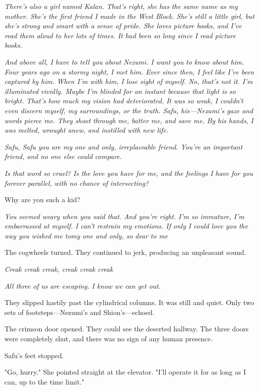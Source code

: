 \emph{There's also a girl named Kalan. That's right, she has the same name as
my mother. She's the first friend I made in the West Block. She's still
a little girl, but she's strong and smart with a sense of pride. She
loves picture books, and I've read them aloud to her lots of times. It
had been so long since I read picture books.}

\emph{And above all, I have to tell you about Nezumi. I want you to know about
him. Four years ago on a stormy night, I met him. Ever since then, I
feel like I've been captured by him. When I'm with him, I lose sight of
myself. No, that's not it. I'm illuminated vividly. Maybe I'm blinded
for an instant because that light is so bright. That's how much my
vision had deteriorated. It was so weak, I couldn't even discern myself,
my surroundings, or the truth. Safu, his---Nezumi's gaze and words pierce
me. They shoot through me, batter me, and save me. By his hands, I was
melted, wrought anew, and instilled with new life.}

\emph{Safu, Safu you are my one and only, irreplaceable friend. You're an
important friend, and no one else could compare.}

\emph{Is that word so cruel? Is the love you have for me, and the feelings I
have for you forever parallel, with no chance of intersecting?}

Why are you such a kid?

\emph{You seemed weary when you said that. And you're right. I'm so immature,
I'm embarrassed at myself. I can't restrain my emotions. If only I could
love you the way you wished me to\el my one and only, so dear to me\el }

The cogwheels turned. They continued to jerk, producing an unpleasant
sound.

\emph{Creak creak creak, creak creak creak\el }

\emph{All three of us are escaping. I know we can get out.}

They slipped hastily past the cylindrical columns. It was still and
quiet. Only two sets of footsteps---Nezumi's and Shion's---echoed.

The crimson door opened. They could see the deserted hallway. The three
doors were completely shut, and there was no sign of any human presence.

Safu's feet stopped.

"Go, hurry." She pointed straight at the elevator. "I'll operate it for
as long as I can, up to the time limit."


